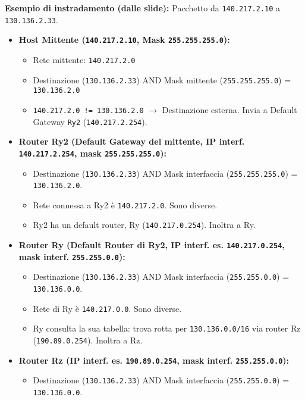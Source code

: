\documentclass{article}
\begin{document}
\textbf{Esempio di instradamento (dalle slide):} Pacchetto da \texttt{140.217.2.10} a \texttt{130.136.2.33}.
\begin{itemize}
    \item \textbf{Host Mittente (\texttt{140.217.2.10}, Mask \texttt{255.255.255.0}):}
    \begin{itemize}
        \item Rete mittente: \texttt{140.217.2.0}
        \item Destinazione (\texttt{130.136.2.33}) AND Mask mittente (\texttt{255.255.255.0}) = \texttt{130.136.2.0}
        \item \texttt{140.217.2.0 != 130.136.2.0} $\rightarrow$ Destinazione esterna. Invia a Default Gateway \texttt{Ry2} (\texttt{140.217.2.254}).
    \end{itemize}
    \item \textbf{Router Ry2 (Default Gateway del mittente, IP interf. \texttt{140.217.2.254}, mask \texttt{255.255.255.0}):}
    \begin{itemize}
        \item Destinazione (\texttt{130.136.2.33}) AND Mask interfaccia (\texttt{255.255.255.0}) = \texttt{130.136.2.0}.
        \item Rete connessa a Ry2 è \texttt{140.217.2.0}. Sono diverse.
        \item Ry2 ha un default router, Ry (\texttt{140.217.0.254}). Inoltra a Ry.
    \end{itemize}
    \item \textbf{Router Ry (Default Router di Ry2, IP interf. es. \texttt{140.217.0.254}, mask interf. \texttt{255.255.0.0}):}
    \begin{itemize}
        \item Destinazione (\texttt{130.136.2.33}) AND Mask interfaccia (\texttt{255.255.0.0}) = \texttt{130.136.0.0}.
        \item Rete di Ry è \texttt{140.217.0.0}. Sono diverse.
        \item Ry consulta la sua tabella: trova rotta per \texttt{130.136.0.0/16} via router Rz (\texttt{190.89.0.254}). Inoltra a Rz.
    \end{itemize}
    \item \textbf{Router Rz (IP interf. es. \texttt{190.89.0.254}, mask interf. \texttt{255.255.0.0}):}
    \begin{itemize}
        \item Destinazione (\texttt{130.136.2.33}) AND Mask interfaccia (\texttt{255.255.0.0}) = \texttt{130.136.0.0}.

\end{itemize}
\end{itemize}
\end{document}
